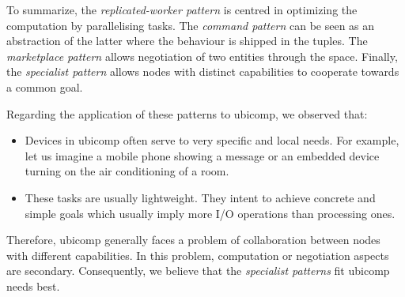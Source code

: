 To summarize, the \emph{replicated-worker pattern} is centred in optimizing the computation by parallelising tasks.
The \emph{command pattern} can be seen as an abstraction of the latter where the behaviour is shipped in the tuples.
The \emph{marketplace pattern} allows negotiation of two entities through the space.
Finally, the \emph{specialist pattern} allows nodes with distinct capabilities to cooperate towards a common goal.







Regarding the application of these patterns to \ac{ubicomp}, we observed that:
\begin{itemize}
  \item Devices in \ac{ubicomp} often serve to very specific and local needs.
        For example, let us imagine a mobile phone showing a message or an embedded device turning on the air conditioning of a room.
  \item These tasks are usually lightweight. %
        They intent to achieve concrete and simple goals which usually imply more I/O operations than processing ones.
\end{itemize}
Therefore, \ac{ubicomp} generally faces a problem of collaboration between nodes with different capabilities.
In this problem, computation or negotiation aspects are secondary. %
Consequently, we believe that the \emph{specialist patterns} fit \ac{ubicomp} needs best.

